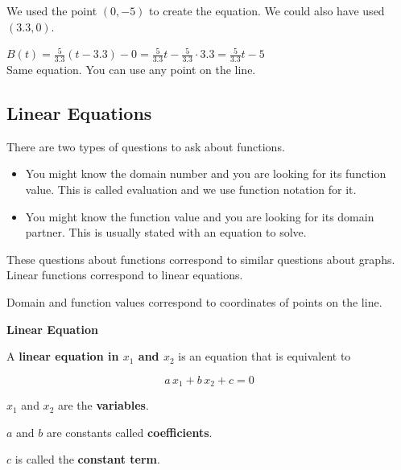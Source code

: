 \documentclass{ximera}
\begin{document}
We used the point $(0, -5)$ to create the equation.  We could also have used $(3.3,0)$.



$B(t) = \frac{5}{3.3} (t - 3.3) - 0 = \frac{5}{3.3} t - \frac{5}{3.3}\cdot 3.3 = \frac{5}{3.3} t -  5$ \\


Same equation.  You can use any point on the line.















\subsection*{Linear Equations}




There are two types of questions to ask about functions.

\begin{itemize}
\item You might know the domain number and you are looking for its function value. This is called evaluation and we use function notation for it.
\item You might know the function value and you are looking for its domain partner. This is usually stated with an equation to solve.
\end{itemize}

These questions about functions correspond to similar questions about graphs.  Linear functions correspond to linear equations.

Domain and function values correspond to coordinates of points on the line.


\begin{definition} \textbf{\textcolor{green!50!black}{Linear Equation}} 


A \textbf{linear equation in $x_1$ and $x_2$} is an equation that is equivalent to 

\[
a \, x_1 + b \, x_2 + c = 0
\]


$x_1$ and $x_2$ are the \textbf{variables}.

$a$ and $b$ are constants called \textbf{coefficients}.

$c$ is called the \textbf{constant term}.

\end{definition}
\end{document}
